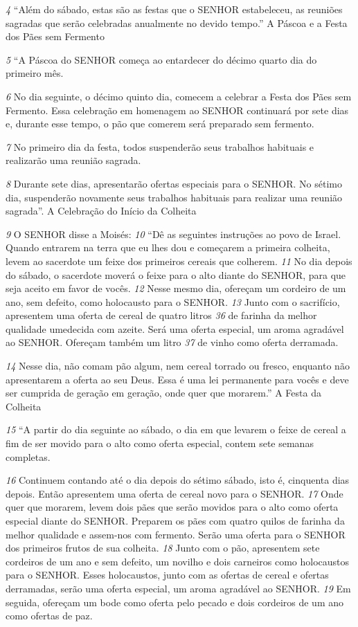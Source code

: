 \textit{\tiny 4} “Além do sábado, estas são as festas que o SENHOR estabeleceu, as reuniões
sagradas que serão celebradas anualmente no devido tempo.”
A Páscoa e a Festa dos Pães sem Fermento
 
\textit{\tiny 5} “A Páscoa do SENHOR começa ao entardecer do décimo quarto dia do primeiro
mês.
 
\textit{\tiny 6} No dia seguinte, o décimo quinto dia, comecem a celebrar a Festa dos
Pães sem Fermento. Essa celebração em homenagem ao SENHOR continuará por
sete dias e, durante esse tempo, o pão que comerem será preparado sem
fermento.
 
\textit{\tiny 7} No primeiro dia da festa, todos suspenderão seus trabalhos habituais
e realizarão uma reunião sagrada.
 
\textit{\tiny 8} Durante sete dias, apresentarão ofertas especiais para o SENHOR. No sétimo dia, suspenderão novamente seus trabalhos
habituais para realizar uma reunião sagrada”.
A Celebração do Início da Colheita
 
\textit{\tiny 9} O SENHOR disse a Moisés: 
\textit{\tiny 10}
“Dê as seguintes instruções ao povo de Israel. Quando
entrarem na terra que eu lhes dou e começarem a primeira colheita, levem ao
sacerdote um feixe dos primeiros cereais que colherem. 
\textit{\tiny 11}
No dia depois do
sábado, o sacerdote moverá o feixe para o alto diante do SENHOR, para que seja
aceito em favor de vocês. 
\textit{\tiny 12}
Nesse mesmo dia, ofereçam um cordeiro de um ano,
sem defeito, como holocausto para o SENHOR. 
\textit{\tiny 13}
Junto com o sacrifício,
apresentem uma oferta de cereal de quatro litros
\textit{\tiny 36}
 de farinha da melhor
qualidade umedecida com azeite. Será uma oferta especial, um aroma agradável
ao SENHOR. Ofereçam também um litro
\textit{\tiny 37}
 de vinho como oferta derramada.

\textit{\tiny 14}
Nesse dia, não comam pão algum, nem cereal torrado ou fresco, enquanto não
apresentarem a oferta ao seu Deus. Essa é uma lei permanente para vocês e deve
ser cumprida de geração em geração, onde quer que morarem.”
A Festa da Colheita

\textit{\tiny 15}
“A partir do dia seguinte ao sábado, o dia em que levarem o feixe de cereal a fim
de ser movido para o alto como oferta especial, contem sete semanas completas.

\textit{\tiny 16}
Continuem contando até o dia depois do sétimo sábado, isto é, cinquenta dias
depois. Então apresentem uma oferta de cereal novo para o SENHOR. 
\textit{\tiny 17}
Onde quer
que morarem, levem dois pães que serão movidos para o alto como oferta especial
diante do SENHOR. Preparem os pães com quatro quilos de farinha da melhor
qualidade e assem-nos com fermento. Serão uma oferta para o SENHOR dos
primeiros frutos de sua colheita. 
\textit{\tiny 18}
Junto com o pão, apresentem sete cordeiros de
um ano e sem defeito, um novilho e dois carneiros como holocaustos para o
SENHOR. Esses holocaustos, junto com as ofertas de cereal e ofertas derramadas,
serão uma oferta especial, um aroma agradável ao SENHOR. 
\textit{\tiny 19}
Em seguida,
ofereçam um bode como oferta pelo pecado e dois cordeiros de um ano como
ofertas de paz.
  
